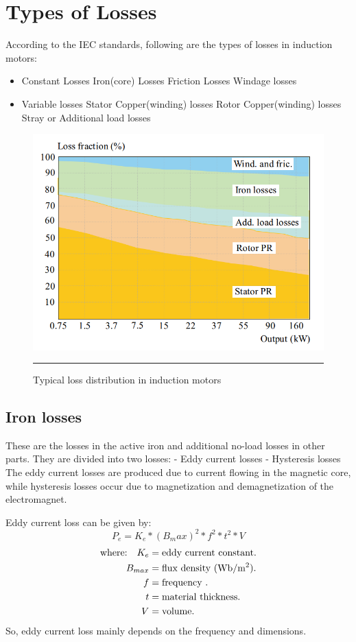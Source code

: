 \section{Types of Losses}
According to the IEC standards\cite{iec6003421}, following are the types of losses in induction motors:
\begin{itemize}
\item Constant Losses
\subitem Iron(core) Losses
\subitem Friction Losses
\subitem Windage losses
\item Variable losses
\subitem Stator Copper(winding) losses
\subitem Rotor Copper(winding) losses
\subitem Stray or Additional load losses 
\end{itemize}

\begin{figure}[htbp]
	\centering
		\includegraphics[width = 4.5in]{./Figures/MS/21.png}
		\rule{35em}{0.5pt}
	\caption{Typical loss distribution in induction motors}
	\label{fig:Typical loss distribution in induction motors}
\end{figure}

\subsection{Iron losses}
These are the losses in the active iron and additional no-load losses in other parts. They are divided into two losses:
-	Eddy current losses
-	Hysteresis losses
The eddy current losses are produced due to current flowing in the magnetic core, while hysteresis losses occur due to magnetization and demagnetization of the electromagnet.

Eddy current loss can be given by:
\begin{equation}
P_e=K_e * (B_max)^2 * f^2 * t^2 * V
\end{equation}
\begin{align*}
\text{where:}\quad
 K_e    &=  \text{eddy current constant.} \\
 B_{max}    &=  \text{flux density (Wb/m\textsuperscript{2}).} \\
 f    &=  \text{frequency .} \\
 t    &=  \text{material thickness.} \\
 V    &=  \text{volume.} \\
\end{align*}
So, eddy current loss mainly depends on the frequency and dimensions.

